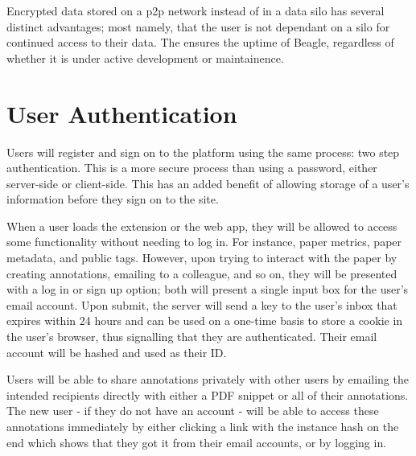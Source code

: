 \documentclass{sig-alternate}
\begin{document}

Encrypted data stored on a p2p network instead of in a data silo has several
distinct advantages; most namely, that the user is not dependant on a silo for
continued access to their data. The ensures the uptime of Beagle, regardless of
whether it is under active development or maintainence.


\section{User Authentication}

Users will register and sign on to the platform using the same process: two step authentication.
This is a more secure process than using a password, either server-side or client-side. %
This has an added benefit of allowing storage of a user's information before they
sign on to the site.

When a user loads the extension or the web app, they will be allowed to access some
functionality without needing to log in. For instance, paper metrics, paper
metadata, and public tags. However, upon trying to interact with the paper by creating
annotations, emailing to a colleague, and so on, they will be presented with a
log in or sign up option; both will present a single input box for the user's
email account. Upon submit, the server will send a key to the user's inbox that
expires within 24 hours and can be used on a one-time basis to store a cookie in
the user's browser, thus signalling that they are authenticated. Their email account
will be hashed and used as their ID.

Users will be able to share annotations privately with other users by emailing the
intended recipients directly with either a PDF snippet or all of their annotations.
The new user - if they do not have an account - will be able to access these
annotations immediately by either clicking a link with the instance hash on the end
which shows that they got it from their email accounts, or by logging in.
\end{document}
